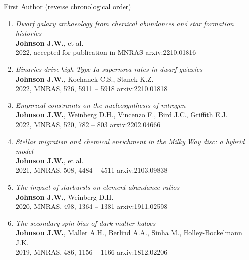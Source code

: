 \documentclass[cv.tex]{subfiles}
\begin{document}
%
\noindent
{\color{themecolor} \large First Author}
(reverse chronological order)
\par\noindent
\begin{enumerate}

	\vspace{-3mm}

	\item \textit{Dwarf galaxy archaeology from chemical abundances and star
	formation histories}
	\\
	\textbf{Johnson J.W.}, et al.
	\\
	2022, accepted for publication in MNRAS \hfill arxiv:2210.01816

	\item \textit{Binaries drive high Type Ia supernova rates in dwarf
	galaxies}
	\\
	\textbf{Johnson J.W.}, Kochanek C.S., Stanek K.Z.
	\\
	2022, MNRAS, 526, 5911 -- 5918 \hfill arxiv:2210.01818

	\item \textit{Empirical constraints on the nucleosynthesis of nitrogen}
	\\
	\textbf{Johnson J.W.}, Weinberg D.H., Vincenzo F., Bird J.C., Griffith E.J.
	\\
	2022, MNRAS, 520, 782 -- 803 \hfill arxiv:2202.04666

	\item \textit{Stellar migration and chemical enrichment in the Milky Way
	disc: a hybrid model}
	\\
	\textbf{Johnson J.W.}, et al.
	\\
	2021, MNRAS, 508, 4484 -- 4511 \hfill arxiv:2103.09838

	\item \textit{The impact of starbursts on element abundance ratios}
	\\
	\textbf{Johnson J.W.}, Weinberg D.H.
	\\
	2020, MNRAS, 498, 1364 -- 1381 \hfill arxiv:1911.02598

	\item \textit{The secondary spin bias of dark matter haloes}
	\\
	\textbf{Johnson J.W.}, Maller A.H., Berlind A.A., Sinha M.,
	Holley-Bockelmann J.K.
	\\
	2019, MNRAS, 486, 1156 -- 1166 \hfill arxiv:1812.02206

\end{enumerate}
\end{document}
